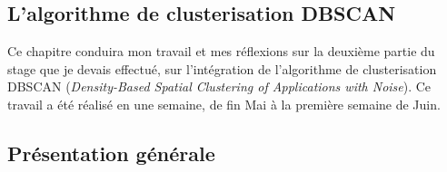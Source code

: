 \documentclass[12pt]{report}
\begin{document}
\begin{spacing}{1.2}
\chapter{L'algorithme de clusterisation DBSCAN}

Ce chapitre conduira mon travail et mes réflexions sur la deuxième partie du stage que je devais effectué, sur l'intégration de l'algorithme de clusterisation DBSCAN (\textit{Density-Based Spatial Clustering of Applications with Noise}).
\newline
Ce travail a été réalisé en une semaine, de fin Mai à la première semaine de Juin.

\section{Présentation générale}


\end{spacing}
\end{document}
